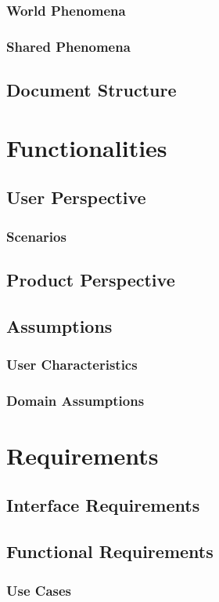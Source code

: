 \documentclass[a4paper, oneside]{book}
\begin{document}
\subsection{World Phenomena}
\subsection{Shared Phenomena}
\section{Document Structure}

\chapter{Functionalities}
\section{User Perspective}
\subsection{Scenarios}
\section{Product Perspective}
\section{Assumptions}
\subsection{User Characteristics}
\subsection{Domain Assumptions}

\chapter{Requirements}
\section{Interface Requirements}
\section{Functional Requirements}
\subsection{Use Cases}
\end{document}
